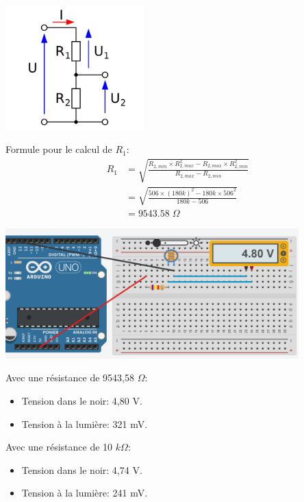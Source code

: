 \documentclass[a4paper]{article}
\begin{document}
\begin{center}
    \includegraphics[width=0.4\textwidth]{images/pont-diviseur-tension.png}
    \hspace{1cm}
\end{center}
Formule pour le calcul de $ R_1 $:
\[ \begin{aligned}
    R_1
    &= \sqrt{\frac{R_{2,min} \times R_{2,max}^2 - R_{2,max} \times R_{2,min}^2}{R_{2,max} - R_{2,min}}} \\
    &= \sqrt{\frac{506 \times (180k)^2 - 180k \times 506^2}{180k - 506}} \\
    &= 9543.58 \; \Omega
\end{aligned} \]
\begin{center}
    \includegraphics[width=0.85\textwidth]{images/pont-diviseur-2.PNG}
\end{center}
Avec une résistance de 9543,58 $ \Omega $:
\begin{itemize}
    \item Tension dans le noir: 4,80 V.
    \item Tension à la lumière: 321 mV.
\end{itemize}
Avec une résistance de 10 $ k\Omega $:
\begin{itemize}
    \item Tension dans le noir: 4,74 V.
    \item Tension à la lumière: 241 mV.
\end{itemize}
\end{document}
